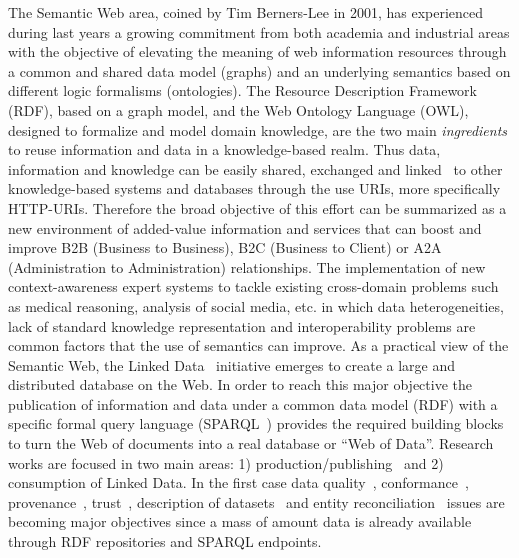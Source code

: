 The Semantic Web area, coined by Tim Berners-Lee in 2001, has experienced during last years a growing 
commitment from both academia and industrial areas  with the objective of elevating the meaning of web 
information resources through a common and shared data model (graphs) and an underlying semantics based 
on different logic formalisms (ontologies). The Resource Description Framework (RDF), based on a graph model, and the Web Ontology Language (OWL), 
designed to formalize and model domain knowledge, are the two main \textit{ingredients} to reuse information and data 
in a knowledge-based realm. Thus data, information and knowledge can be easily shared, exchanged and linked~\cite{Maali_Cyganiak_2011} 
to other knowledge-based systems and databases through the use URIs, more specifically HTTP-URIs. Therefore the broad objective of this effort can be summarized 
as a new environment of added-value information and services that can boost and improve B2B (Business to Business), B2C (Business to Client) or 
A2A (Administration to Administration) relationships. The implementation of new context-awareness expert systems to tackle existing 
cross-domain problems such as medical reasoning, analysis of social media, etc. in which data heterogeneities, 
lack of standard knowledge representation and interoperability problems are common factors that the use of semantics can improve. As a practical view of the Semantic Web, 
the Linked Data~\cite{Berners-Lee-2006,Heath_Bizer_2011} initiative emerges to create a large and distributed database on the Web. 
In order to reach this major objective the publication of information and data under a common data model (RDF) 
with a specific formal query language (SPARQL~\cite{Sparql11}) provides the required building blocks to turn the Web of documents 
into a real database or ``Web of Data''. Research works are focused in two main areas: 1) production/publishing~\cite{bizer07how} and 2) consumption of 
Linked Data. In the first case data quality~\cite{bizer2007,Bizer2009QA,lodq,link-qa}, conformance~\cite{DBLP:journals/ws/HoganUHCPD12}, 
provenance~\cite{w3c-prov,DBLP:conf/ipaw/HartigZ10}, trust~\cite{Carroll05namedgraphs}, description of 
datasets~\cite{void,Cyganiak08semanticsitemaps,ckanValidator} and entity reconciliation~\cite{Serimi,Maali_Cyganiak_2011} issues are 
becoming major objectives since a mass of amount data is already available through RDF repositories and SPARQL endpoints. 

